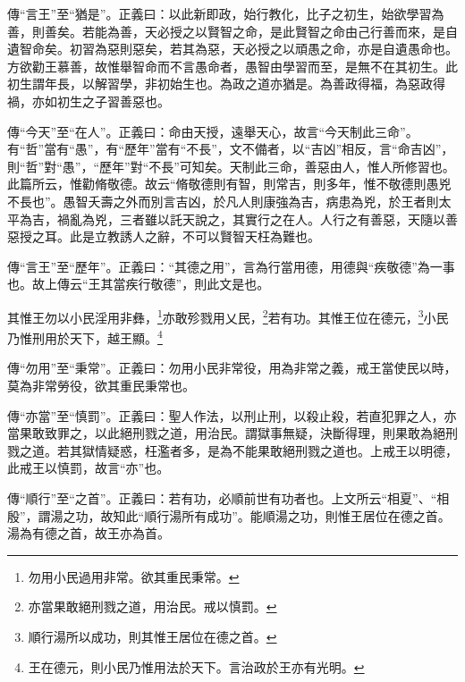 {\noindent\zhuan{}\fzbyks 傳“言王”至“猶是”。正義曰：以此新即政，始行教化，比子之初生，始欲學習為善，則善矣。若能為善，天必授之以賢智之命，是此賢智之命由己行善而來，是自遺智命矣。初習為惡則惡矣，若其為惡，天必授之以頑愚之命，亦是自遺愚命也。方欲勸王慕善，故惟舉智命而不言愚命者，愚智由學習而至，是無不在其初生。此初生謂年長，以解習學，非初始生也。為政之道亦猶是。為善政得福，為惡政得禍，亦如初生之子習善惡也。 \par}

{\noindent\zhuan{}\fzbyks 傳“今天”至“在人”。正義曰：命由天授，遠舉天心，故言“今天制此三命”。有“哲”當有“愚”，有“歷年”當有“不長”，文不備者，以“吉凶”相反，言“命吉凶”，則“哲”對“愚”，“歷年”對“不長”可知矣。天制此三命，善惡由人，惟人所修習也。此篇所云，惟勸脩敬德。故云“脩敬德則有智，則常吉，則多年，惟不敬德則愚兇不長也”。愚智夭壽之外而別言吉凶，於凡人則康強為吉，病患為兇，於王者則太平為吉，禍亂為兇，三者雖以託天說之，其實行之在人。人行之有善惡，天隨以善惡授之耳。此是立教誘人之辭，不可以賢智天枉為難也。 \par}

{\noindent\zhuan{}\fzbyks 傳“言王”至“歷年”。正義曰：“其德之用”，言為行當用德，用德與“疾敬德”為一事也。故上傳云“王其當疾行敬德”，則此文是也。 \par}

其惟王勿以小民淫用非彝，\footnote{勿用小民過用非常。欲其重民秉常。}亦敢殄戮用乂民，\footnote{亦當果敢絕刑戮之道，用治民。戒以慎罰。}若有功。其惟王位在德元，\footnote{順行湯所以成功，則其惟王居位在德之首。}小民乃惟刑用於天下，越王顯。\footnote{王在德元，則小民乃惟用法於天下。言治政於王亦有光明。}

{\noindent\zhuan{}\fzbyks 傳“勿用”至“秉常”。正義曰：勿用小民非常役，用為非常之義，戒王當使民以時，莫為非常勞役，欲其重民秉常也。 \par}

{\noindent\zhuan{}\fzbyks 傳“亦當”至“慎罰”。正義曰：聖人作法，以刑止刑，以殺止殺，若直犯罪之人，亦當果敢致罪之，以此絕刑戮之道，用治民。謂獄事無疑，決斷得理，則果敢為絕刑戮之道。若其獄情疑惑，枉濫者多，是為不能果敢絕刑戮之道也。上戒王以明德，此戒王以慎罰，故言“亦”也。 \par}

{\noindent\zhuan{}\fzbyks 傳“順行”至“之首”。正義曰：若有功，必順前世有功者也。上文所云“相夏”、“相殷”，謂湯之功，故知此“順行湯所有成功”。能順湯之功，則惟王居位在德之首。湯為有德之首，故王亦為首。 \par}

